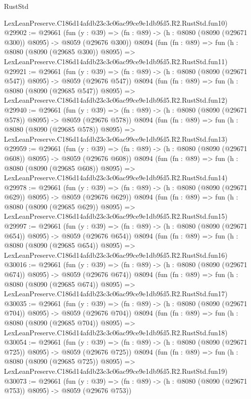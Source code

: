 \begin{lexlean}{RustStd}
\begin{coremodule}
    LexLeanPreserve.C186d14afdb23c3c06ac99ce9e1db9fd5.R2.RustStd.fun10)
@29902 := @29661
    (fun (y : @39) => (fn : @89) -> (h : @8080 (@8090 (@29671 @300)) @8095) -> @8059 (@29676 @300))
    @8094
    (fun (fn : @89) =>
    fun (h : @8080 (@8090 (@29685 @300)) @8095) =>
    LexLeanPreserve.C186d14afdb23c3c06ac99ce9e1db9fd5.R2.RustStd.fun11)
@29921 := @29661
    (fun (y : @39) => (fn : @89) -> (h : @8080 (@8090 (@29671 @547)) @8095) -> @8059 (@29676 @547))
    @8094
    (fun (fn : @89) =>
    fun (h : @8080 (@8090 (@29685 @547)) @8095) =>
    LexLeanPreserve.C186d14afdb23c3c06ac99ce9e1db9fd5.R2.RustStd.fun12)
@29940 := @29661
    (fun (y : @39) => (fn : @89) -> (h : @8080 (@8090 (@29671 @578)) @8095) -> @8059 (@29676 @578))
    @8094
    (fun (fn : @89) =>
    fun (h : @8080 (@8090 (@29685 @578)) @8095) =>
    LexLeanPreserve.C186d14afdb23c3c06ac99ce9e1db9fd5.R2.RustStd.fun13)
@29959 := @29661
    (fun (y : @39) => (fn : @89) -> (h : @8080 (@8090 (@29671 @608)) @8095) -> @8059 (@29676 @608))
    @8094
    (fun (fn : @89) =>
    fun (h : @8080 (@8090 (@29685 @608)) @8095) =>
    LexLeanPreserve.C186d14afdb23c3c06ac99ce9e1db9fd5.R2.RustStd.fun14)
@29978 := @29661
    (fun (y : @39) => (fn : @89) -> (h : @8080 (@8090 (@29671 @629)) @8095) -> @8059 (@29676 @629))
    @8094
    (fun (fn : @89) =>
    fun (h : @8080 (@8090 (@29685 @629)) @8095) =>
    LexLeanPreserve.C186d14afdb23c3c06ac99ce9e1db9fd5.R2.RustStd.fun15)
@29997 := @29661
    (fun (y : @39) => (fn : @89) -> (h : @8080 (@8090 (@29671 @654)) @8095) -> @8059 (@29676 @654))
    @8094
    (fun (fn : @89) =>
    fun (h : @8080 (@8090 (@29685 @654)) @8095) =>
    LexLeanPreserve.C186d14afdb23c3c06ac99ce9e1db9fd5.R2.RustStd.fun16)
@30016 := @29661
    (fun (y : @39) => (fn : @89) -> (h : @8080 (@8090 (@29671 @674)) @8095) -> @8059 (@29676 @674))
    @8094
    (fun (fn : @89) =>
    fun (h : @8080 (@8090 (@29685 @674)) @8095) =>
    LexLeanPreserve.C186d14afdb23c3c06ac99ce9e1db9fd5.R2.RustStd.fun17)
@30035 := @29661
    (fun (y : @39) => (fn : @89) -> (h : @8080 (@8090 (@29671 @704)) @8095) -> @8059 (@29676 @704))
    @8094
    (fun (fn : @89) =>
    fun (h : @8080 (@8090 (@29685 @704)) @8095) =>
    LexLeanPreserve.C186d14afdb23c3c06ac99ce9e1db9fd5.R2.RustStd.fun18)
@30054 := @29661
    (fun (y : @39) => (fn : @89) -> (h : @8080 (@8090 (@29671 @725)) @8095) -> @8059 (@29676 @725))
    @8094
    (fun (fn : @89) =>
    fun (h : @8080 (@8090 (@29685 @725)) @8095) =>
    LexLeanPreserve.C186d14afdb23c3c06ac99ce9e1db9fd5.R2.RustStd.fun19)
@30073 := @29661
    (fun (y : @39) => (fn : @89) -> (h : @8080 (@8090 (@29671 @753)) @8095) -> @8059 (@29676 @753))

\end{coremodule}
\end{lexlean}
